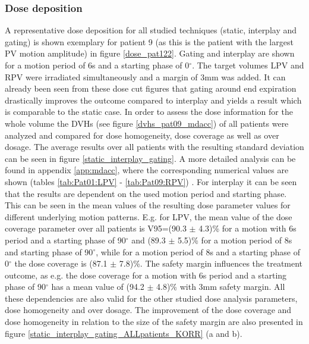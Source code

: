 \subsubsection{Dose deposition}

A representative dose deposition for all studied techniques (static, interplay and gating) is shown exemplary for patient 9 (as this is the 
patient with the largest PV motion amplitude) in figure \ref{dose_pat122}. Gating and interplay are shown for a motion period of 6s 
and a starting phase of 0$^{\circ}$. The target volumes LPV and RPV were irradiated simultaneously and a margin of 3mm was added. It can 
already been seen from these dose cut figures that gating around end expiration drastically improves the outcome compared to interplay and yields 
a result which is comparable to the static case.\newline
\newline
In order to assess the dose information for the whole volume the DVHs (see figure \ref{dvhs_pat09_mdacc}) of all patients were analyzed and compared for dose homogeneity, 
dose coverage as well as over dosage. The average results over all patients with the resulting standard deviation can be seen in 
figure \ref{static_interplay_gating}. A more detailed analysis can be found in appendix \ref{app:mdacc}, where the corresponding numerical 
values are shown (tables \ref{tab:Pat01:LPV} - \ref{tab:Pat09:RPV}) .\newline
\newline
For interplay it can be seen that the results are dependent on the used motion period and starting phase. This can be seen in the 
mean values of the resulting dose parameter values for different underlying motion patterns. E.g. for LPV, the mean value of the dose 
coverage parameter over all patients is V95=(90.3 $\pm$ 4.3)\% for a motion with 6s period and a starting phase of 90$^{\circ}$ and 
(89.3 $\pm$ 5.5)\% for a motion period of 8s and starting phase of 90$^{\circ}$, while for a motion period of 8s 
and a starting phase of 0$^{\circ}$ the dose coverage is (87.1 $\pm$ 7.8)\%. 
The safety margin influences the treatment outcome, as e.g. the dose coverage for a motion with 6s period 
and a starting phase of 90$^{\circ}$ has a mean value of (94.2 $\pm$ 4.8)\% with 3mm safety margin. All these dependencies are also valid for 
the other studied dose analysis parameters, dose homogeneity and over dosage. The improvement of the dose coverage and dose homogeneity 
in relation to the size of the safety margin are also presented in figure \ref{static_interplay_gating_ALLpatients_KORR} (a and b). 
